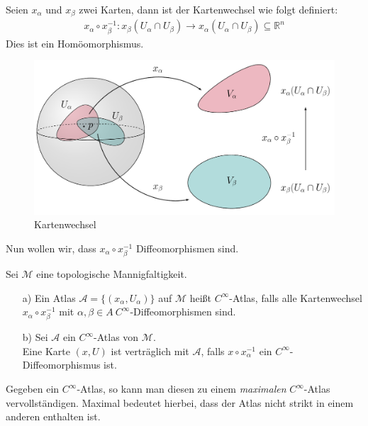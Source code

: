 \begin{defs}[Kartenwechsel]
Seien $x_{\alpha}$ und $x_{\beta}$ zwei Karten, dann ist der Kartenwechsel wie folgt definiert: \\
\begin{align}
x_{\alpha}\circ x_{\beta}^{-1}: x_{\beta}(U_{\alpha}\cap U_{\beta}) \rightarrow x_{\alpha}(U_{\alpha}\cap U_{\beta}) \subseteq \mathbb{R}^n
\end{align}
Dies ist ein Homöomorphismus.

\begin{figure}[H]
\centering
\includegraphics[width=1.0\linewidth]{figures/tikz/map_change.pdf}
\caption{Kartenwechsel}
\label{img:kartenwechsel}
\end{figure} 

\end{defs}
Nun wollen wir, dass $x_{\alpha}\circ x_{\beta}^{-1}$ Diffeomorphismen sind.
\begin{defs}
Sei $ \mathcal{M}$ eine topologische Mannigfaltigkeit.
\begin{enumerate}
	\item[a)] Ein Atlas $\mathcal{A} = \{(x_{\alpha},U_{\alpha})\}$ auf $\mathcal{M}$ heißt $C^{\infty}$-Atlas, falls alle Kartenwechsel $x_{\alpha}\circ x_{\beta}^{-1}$ mit $\alpha, \beta \in A \ C^{\infty}$-Diffeomorphismen sind.
	\item[b)] Sei $\mathcal{A}$ ein $C^{\infty}$-Atlas von $\mathcal{M}$. \\
	Eine Karte $(x,U)$ ist verträglich mit $\mathcal{A}$, falls $x \circ x_\alpha^{-1}$ ein $C^{\infty}$-Diffeomorphismus ist.
\end{enumerate}
\end{defs}
Gegeben ein $C^{\infty}$-Atlas, so kann man diesen zu einem \textit{maximalen} $C^{\infty}$-Atlas vervollständigen. Maximal bedeutet hierbei, dass der Atlas nicht strikt in einem anderen enthalten ist.

